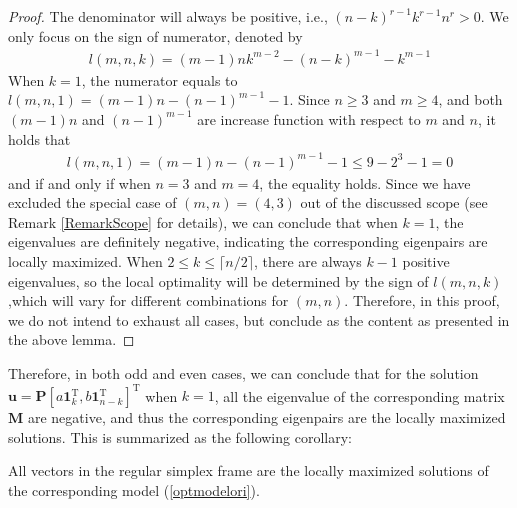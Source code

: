 \begin{proof}
The  denominator  will always be positive, i.e., 
$(n-k)^{r-1} k^{r-1}  n^{r} >0 $. 
We only focus on the sign of numerator,  denoted  by
\begin{align}
l(m,n, k)
=
(m-1)nk^{m-2} - (n-k)^{m-1}- k^{m-1}
\end{align}
When $k=1$, the  numerator   equals  to     $
l(m,n, 1) = (m-1)n - (n-1)^{m-1}-1 $. 
Since $n \ge 3$ and $m \ge 4$, and both $  (m-1)n $  and  $ (n-1)^{m-1} $ are  increase function with respect to  $m$ and $n$,  
it holds that 
\begin{align}
l(m,n, 1)
= 
(m-1)n - (n-1)^{m-1}- 1 \le 9-2^{3}- 1 =0
\end{align}
and if and only  if  when $n = 3$ and $m = 4$,  the  equality holds.
Since  we have  excluded the special case of $ (m,n)=(4,3) $
out of the discussed scope (see  Remark  \ref{RemarkScope}  for  details),  
we can conclude that when $k=1$, the eigenvalues  are  definitely  negative, indicating  the  corresponding   eigenpairs   are  locally maximized.
When $2 \le  k \le \lceil n/2  \rceil $,
there are 
always  $k-1$ positive eigenvalues, so the local 
optimality will be determined by the sign of
$l(m,n, k) $,which will vary  for   different combinations for $(m,n)$.
Therefore, in this proof, we do not intend to 
exhaust all cases, but conclude as the content as presented in the above lemma.
\end{proof}


Therefore, 
in both odd  and even  cases, 
we can conclude that  
for the solution 
$ 	\mathbf u
=
\mathbf P
[
a \mathbf 1_{k}^{\mathrm T},
b \mathbf 1_{n-k}^{\mathrm T}
]^{\mathrm T} $   when $k=1$,  
all   the eigenvalue of the  corresponding  matrix  $\mathbf M$ are   negative, and  thus  the  corresponding  eigenpairs are the locally maximized solutions.
This is summarized as the following corollary:
\begin{corollary}\label{coroll}
	All vectors in the regular simplex frame  are the locally maximized solutions of 
	the corresponding model (\ref{optmodelori}).
	\end{corollary}


%
%


